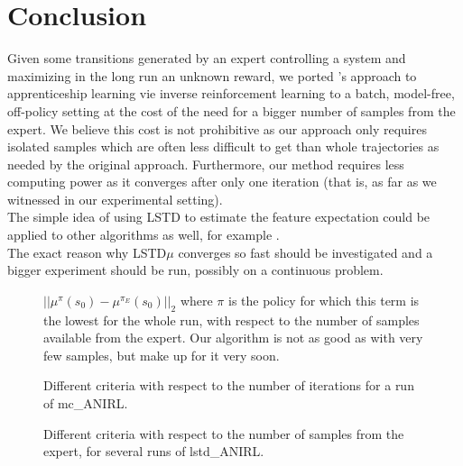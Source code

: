 \documentclass{jfpda2011}
\begin{document}
\section{Conclusion}
\label{sec:conclusion}
Given some transitions generated by an expert controlling a system and maximizing in the long run an unknown reward, we ported \citet{abbeel2004apprenticeship}'s approach to apprenticeship learning vie inverse reinforcement learning to a batch, model-free, off-policy setting at the cost of the need for a bigger number of samples from the expert. We believe this cost is not prohibitive as our approach only requires isolated samples which are often less difficult to get than whole trajectories as needed by the original approach. Furthermore, our method requires less computing power as it converges after only one iteration (that is, as far as we witnessed in our experimental setting).\\

The simple idea of using LSTD to estimate the feature expectation could be applied to other algorithms as well, for example \cite{abbeel2004apprenticeship,syed2008apprenticeship,syed2008game,ziebart2008maximum}.\\
The exact reason why LSTD$\mu$ converges so fast should be investigated and a bigger experiment should be run, possibly on a continuous problem.\\
\begin{figure}
\centering

\caption{$||\mu^{\pi}(s_0) - \mu^{\pi_E}(s_0)||_2$ where $\pi$ is the policy for which this term is the lowest for the whole run, with respect to the number of samples available from the expert. Our algorithm is not as good as \citet{abbeel2004apprenticeship} with very few samples, but make up for it very soon.}
\label{fig:E}
\end{figure}
\begin{figure}
\centering

\caption{Different criteria with respect to the number of iterations for a run of mc\_ANIRL.}
\label{fig:A}
\end{figure}
\begin{figure}
\centering

\caption{Different criteria with respect to the number of samples from the expert, for several runs of lstd\_ANIRL.}
\label{fig:B}
\end{figure}
%

\end{document}
